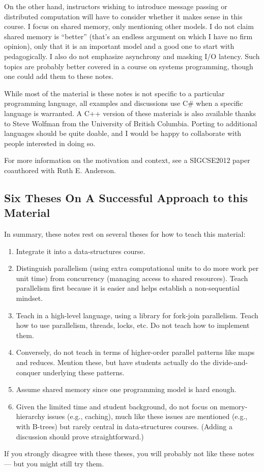 \documentclass[10pt]{article}
\begin{document}
On the other hand, instructors wishing to introduce message passing or
distributed computation will have to consider whether it makes sense
in this course.  I focus on shared memory, only mentioning other
models.  I do not claim shared memory is ``better'' (that's an endless
argument on which I have no firm opinion), only that it is an
important model and a good one to start with pedagogically.  I also do
not emphasize asynchrony and masking I/O latency.  Such topics are
probably better covered in a course on systems programming, though one
could add them to these notes.

While most of the material is these notes is not specific to a
particular programming language, all examples and discussions use C\#
when a specific language is warranted.  A C++ version of these
materials is also available thanks to Steve Wolfman from
the University of British Columbia.  Porting to additional languages
should be quite doable, and I would be happy to collaborate with people
interested in doing so.

For more information on the motivation and context, see a SIGCSE2012
paper coauthored with Ruth E. Anderson.%

\subsection{Six Theses On A Successful Approach to this Material}

In summary, these notes rest on several theses for how to teach this
material:
\begin{enumerate}
\item Integrate it into a data-structures course.
\item Distinguish parallelism (using extra computational units to do more work
  per unit time) from concurrency (managing access to shared
  resources).  Teach parallelism first because it is easier and helps
  establish a non-sequential mindset.
\item Teach in a high-level language, using a library for fork-join
  parallelism.  Teach how to use parallelism, threads, locks, etc.  Do
  not teach how to implement them.  
\item Conversely, do not teach in terms
  of higher-order parallel patterns like maps and reduces.  Mention
  these, but have students actually do the divide-and-conquer
  underlying these patterns.
\item Assume shared memory since one programming model is hard enough.
  \item Given the limited time and student background, do not focus on
  memory-hierarchy issues (e.g., caching), much like these issues are
  mentioned (e.g., with B-trees) but rarely central in data-structures
  courses. (Adding a discussion should prove straightforward.)
\end{enumerate}
If you strongly disagree with these theses, you will probably
not like these notes --- but you might still try them.
\end{document}
